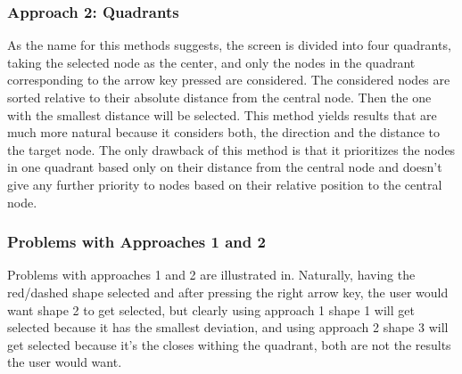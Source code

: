 \subsubsection{Approach 2: Quadrants}
As the name for this methods suggests, the screen is divided into four quadrants, taking the selected node as the center, and only the nodes in the quadrant corresponding to the arrow key pressed are considered. The considered nodes are sorted relative to their absolute distance from the central node. Then the one with the smallest distance will be selected. This method yields results that are much more natural because it considers both, the direction and the distance to the target node. The only drawback of this method is that it prioritizes the nodes in one quadrant based only on their distance from the central node and doesn't give any further priority to nodes based on their relative position to the central node.
\begin{spacing}{2}\end{spacing}
\noindent
{}

\subsubsection{Problems with Approaches 1 and 2}
Problems with approaches 1 and 2 are illustrated in. Naturally, having the red/dashed shape selected and after pressing the right arrow key, the user would want shape 2 to get selected, but clearly using approach 1 shape 1 will get selected because it has the smallest deviation, and using approach 2 shape 3 will get selected because it's the closes withing the quadrant, both are not the results the user would want.

